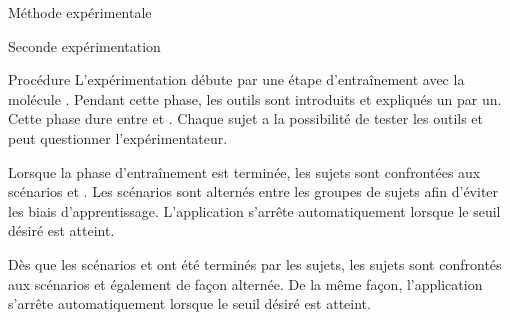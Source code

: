 \documentclass[myfrancais]{mythesis}
\begin{document}
\begin{mychapter}{Méthode expérimentale}
\begin{mysection}{Seconde expérimentation}
\begin{mysubsection}{Procédure}
				L'expérimentation débute par une étape d'entraînement avec la molécule \myPrion.
				Pendant cette phase, les outils sont introduits et expliqués un par un.
				Cette phase dure entre  et .
				Chaque sujet a la possibilité de tester les outils et peut questionner l'expérimentateur.

				Lorsque la phase d'entraînement est terminée, les sujets sont confrontées aux scénarios  et .
				Les scénarios sont alternés entre les groupes de sujets afin d'éviter les biais d'apprentissage.
				L'application s'arrête automatiquement lorsque le seuil  désiré est atteint.

				Dès que les scénarios  et  ont été terminés par les sujets, les sujets sont confrontés aux scénarios  et  également de façon alternée.
				De la même façon, l'application s'arrête automatiquement lorsque le seuil  désiré est atteint.


\end{mysubsection}
\end{mysection}
\end{mychapter}
\end{document}
